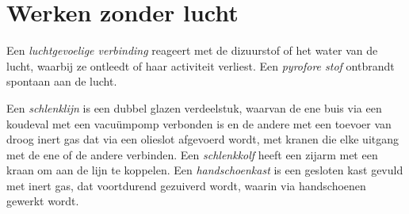 \section{Werken zonder lucht}

\begin{definition}\label{def:b3:lab-techniques-3:air-sensitive}
Een \emph{luchtgevoelige verbinding}
reageert met de dizuurstof of het water van de lucht, waarbij ze ontleedt
of haar activiteit verliest. Een
\emph{pyrofore stof} ontbrandt spontaan aan de
lucht.
\end{definition}

\begin{definition}\label{def:b3:lab-techniques-3:schlenk}
Een \emph{schlenklijn} is een dubbel glazen
verdeelstuk, waarvan de ene buis via een koudeval met een vacuümpomp
verbonden is en de andere met een toevoer van droog inert gas dat via een
olieslot afgevoerd wordt, met kranen die elke uitgang met de ene of de
andere verbinden. Een \emph{schlenkkolf} heeft een
zijarm met een kraan om aan de lijn te koppelen. Een
\emph{handschoenkast} is een gesloten kast gevuld
met inert gas, dat voortdurend gezuiverd wordt, waarin via handschoenen
gewerkt wordt.
\end{definition}

